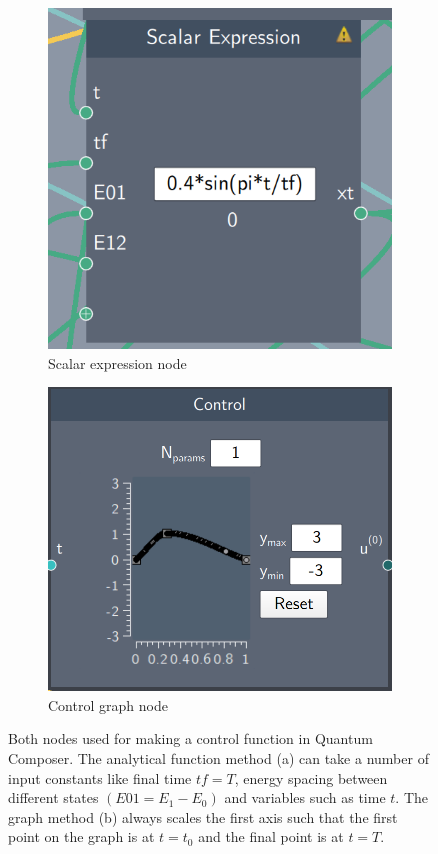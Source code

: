 \documentclass[aps,pra,reprint,superscriptaddress]{revtex4-1}
\begin{document}
\begin{figure}[h]
	\begin{subfigure}[b]{0.4\columnwidth}
		\centering
		\includegraphics[width=\columnwidth]{graphics/ScalarExpressionNode.png}
		\caption{Scalar expression node}
	\end{subfigure}
	\hfill
	\begin{subfigure}[b]{0.45\columnwidth}
		\centering
		\includegraphics[width=\columnwidth]{graphics/ControlNode.png}
		\caption{Control graph node}
	\end{subfigure}
	\caption{Both nodes used for making a control function in Quantum Composer. The analytical function method (a) can take a number of input constants like final time $tf = T$, energy spacing between different states $(E01 = E_1 - E_0)$ and variables such as time $t$. The graph method (b) always scales the first axis such that the first point on the graph is at $t=t_0$ and the final point is at $t=T$.}
	\label{fig:Controls}
\end{figure}
\end{document}
